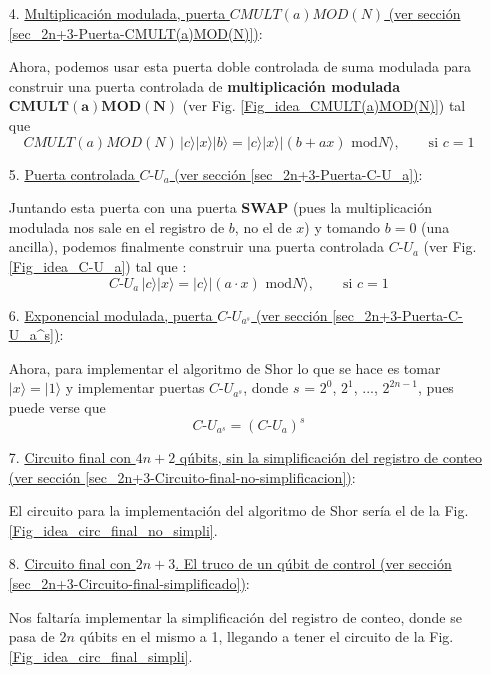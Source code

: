 \documentclass[a4paper,11pt]{book} %
\numberwithin{equation}{chapter}
\begin{document}
\begin{itemize}
	\item[4.] \underline{Multiplicación modulada, puerta ${CMULT(a)MOD(N)}$ (ver sección \ref{sec_2n+3-Puerta-CMULT(a)MOD(N)})}: 
	
	Ahora, podemos usar esta puerta doble controlada de suma modulada para construir una puerta controlada de \textbf{multiplicación modulada} $\bm{CMULT(a)MOD(N)}$ (ver Fig. \ref{Fig_idea_CMULT(a)MOD(N)}) tal que
	\begin{equation}
	\boxed{CMULT(a)MOD(N) \, |c \rangle |x \rangle |b \rangle = |c \rangle |x \rangle | (b + a  x) \text{ mod} N \rangle, \qquad \text{si }  c = 1}
	\end{equation}


	\item[5.] \underline{Puerta controlada ${C\text{-}U_a}$ (ver sección \ref{sec_2n+3-Puerta-C-U_a})}: 
	
	Juntando esta puerta con una puerta \textbf{SWAP} (pues la multiplicación modulada nos sale en el registro de $b$, no el de $x$) y tomando $b = 0$ (una ancilla), podemos finalmente construir una puerta controlada $C\text{-}U_a$ (ver Fig. \ref{Fig_idea_C-U_a}) tal que :
	\begin{equation}
	\boxed{C \text{-} U_a \, |c \rangle |x \rangle = |c \rangle | (a \cdot x) \text{ mod} N \rangle, \qquad \text{si }  c = 1}
	\end{equation}



	\item[6.] \underline{Exponencial modulada, puerta ${C\text{-}U_{a^{s}}}$ (ver sección \ref{sec_2n+3-Puerta-C-U_a^s})}: 
	
	Ahora, para implementar el algoritmo de Shor lo que se hace es tomar $ |x \rangle = | 1 \rangle$ y implementar puertas $C\text{-}U_{a^{s}}$, donde $s$ = $2^0$, $2^1$, ..., $2^{2n-1}$, pues puede verse que
	\begin{equation}
 	\boxed{C\text{-}U_{a^{s}} = (C\text{-}U_{a})^s}
 	\end{equation} 

	\item[7.] \underline{Circuito final con ${4n+2}$ qúbits, sin la simplificación del registro de conteo (ver sección \ref{sec_2n+3-Circuito-final-no-simplificacion})}: 
	
	El circuito para la implementación del algoritmo de Shor sería el de la Fig. \ref{Fig_idea_circ_final_no_simpli}.
	
	
	\item[8.] \underline{Circuito final con ${2n+3}$. El truco de un qúbit de control (ver sección \ref{sec_2n+3-Circuito-final-simplificado})}: 
	
	Nos faltaría implementar la simplificación del registro de conteo, donde se pasa de $2n$ qúbits en el mismo a 1, llegando a tener el circuito de la Fig. \ref{Fig_idea_circ_final_simpli}.


\end{itemize}
\end{document}
